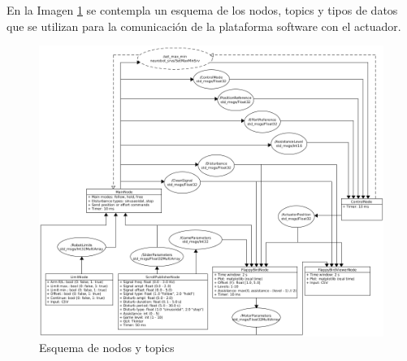 En la Imagen \ref{fig:nodes} se contempla un esquema de los nodos, topics y tipos de datos que se utilizan para la comunicación de la plataforma software con el actuador.

\begin{figure}[ht!]
	\centering
	\begin{minipage}{1.0\linewidth}
		\centering
		\includegraphics[width=\linewidth]{figs/esquema_nodos.png}
	\end{minipage}
	\caption[Esquema de nodos y topics]{Esquema de nodos y topics}
	\label{fig:nodes}
\end{figure}

